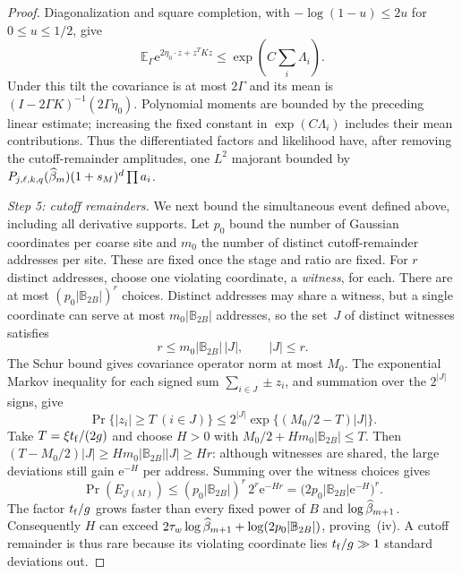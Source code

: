 \begin{proof}
Diagonalization and square completion, with $-\log(1-u)\le2u$ for $0\le u\le1/2$, give
\begin{equation*}
\mathbb E_\Gamma \mathrm e^{2\eta_0\cdot z+z^TKz}
 \le\exp\!\left(C\sum_i\Lambda_i\right).
\end{equation*}
Under this tilt the covariance is at most $2\Gamma$ and its mean is $(I-2\Gamma K)^{-1}(2\Gamma\eta_0)$. Polynomial moments are bounded by the preceding linear estimate; increasing the fixed constant in $\exp(C\Lambda_i)$ includes their mean contributions.
Thus the differentiated factors and likelihood have, after removing the cutoff-remainder amplitudes, one $L^2$ majorant bounded by $P_{j,\ell,k,q}(\widehat{\beta}_m)(1+s_M)^d\prod a_i$.

\emph{Step 5: cutoff remainders.} We next bound the simultaneous event defined above, including all derivative supports. Let $p_0$ bound the number of Gaussian coordinates per coarse site and $m_0$ the number of distinct cutoff-remainder addresses per site. These are fixed once the stage and ratio are fixed. For $r$ distinct addresses, choose one violating coordinate, a \emph{witness}, for each. There are at most $(p_0|\mathbb B_{2B}|)^r$ choices. Distinct addresses may share a witness, but a single coordinate can serve at most $m_0|\mathbb B_{2B}|$ addresses, so the set~$J$ of distinct witnesses satisfies
\begin{equation*}
r\le m_0|\mathbb B_{2B}|\,|J|,\qquad |J|\le r.
\end{equation*}
The Schur bound gives covariance operator norm at most $M_0$. The exponential Markov inequality for each signed sum $\sum_{i\in J}\pm z_i$, and summation over the $2^{|J|}$ signs, give
\begin{equation*}
\Pr\{|z_i|\ge T\ (i\in J)\}\le2^{|J|}\exp\{(M_0/2-T)|J|\}.
\end{equation*}
Take $T=\xi t_{\rm f}/(2g)$ and choose $H>0$ with $M_0/2+Hm_0|\mathbb B_{2B}|\le T$. Then $(T-M_0/2)|J|\ge Hm_0|\mathbb B_{2B}||J|\ge Hr$: although witnesses are shared, the large deviations still gain $\mathrm e^{-H}$ per address. Summing over the witness choices gives
\begin{equation*}
\Pr(E_{\mathcal J(M)})\le(p_0|\mathbb B_{2B}|)^r\,2^r\mathrm e^{-Hr}=
\bigl(2p_0|\mathbb B_{2B}|\mathrm e^{-H}\bigr)^r.
\end{equation*}
The factor $t_{\rm f}/g$ grows faster than every fixed power of $B$ and $\log\widehat{\beta}_{m+1}$. Consequently $H$ can exceed $2\tau_w\log\widehat{\beta}_{m+1}+\log(2p_0|\mathbb B_{2B}|)$, proving~(iv). A cutoff remainder is thus rare because its violating coordinate lies $t_{\rm f}/g\gg1$ standard deviations out.


\end{proof}

